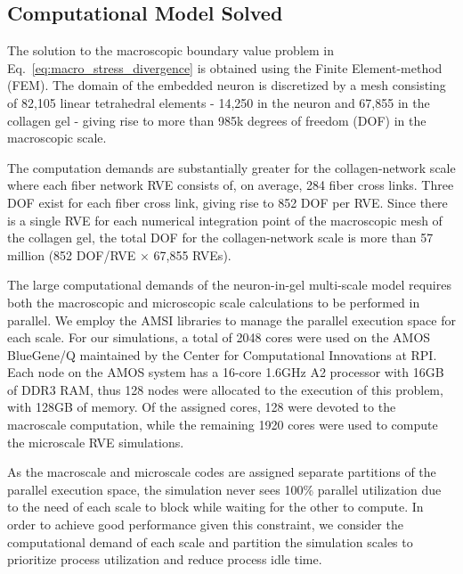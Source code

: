 \documentclass[]{interact}
\begin{document}
\subsection{Computational Model Solved}\label{sec:specification}
The solution to the macroscopic boundary value problem in Eq.\ \eqref{eq:macro_stress_divergence} is obtained using the Finite Element-method (FEM). The domain of the embedded neuron is discretized by a mesh consisting of  82,105 linear tetrahedral elements - 14,250 in the neuron and 67,855 in the collagen gel - giving rise to more than 985k degrees of freedom (DOF) in the macroscopic scale.

The computation demands are substantially greater for the collagen-network scale where each fiber network RVE consists of, on average, 284 fiber cross links. Three DOF exist for each fiber cross link, giving rise to 852 DOF per RVE. Since there is a single RVE for each numerical integration point of the macroscopic mesh of the collagen gel, the total DOF for the collagen-network scale is more than 57 million (852 DOF/RVE $\times$ 67,855 RVEs). 

The large computational demands of the neuron-in-gel multi-scale model requires both the macroscopic and microscopic scale calculations to be performed in parallel. We employ the AMSI libraries to manage the parallel execution space for each scale. For our simulations, a total of 2048 cores were used on the AMOS BlueGene/Q maintained by the Center for Computational Innovations at RPI. Each node on the AMOS system has a 16-core 1.6GHz A2 processor with 16GB of DDR3 RAM, thus 128 nodes were allocated to the execution of this problem, with 128GB of memory. Of the assigned cores, 128 were devoted to the macroscale computation, while the remaining 1920 cores were used to compute the microscale RVE simulations. 

As the macroscale and microscale codes are assigned separate partitions of the parallel execution space, the simulation never sees 100\% parallel utilization due to the need of each scale to block while waiting for the other to compute. In order to achieve good performance given this constraint, we consider the computational demand of each scale and partition the simulation scales to prioritize process utilization and reduce process idle time.
\end{document}
